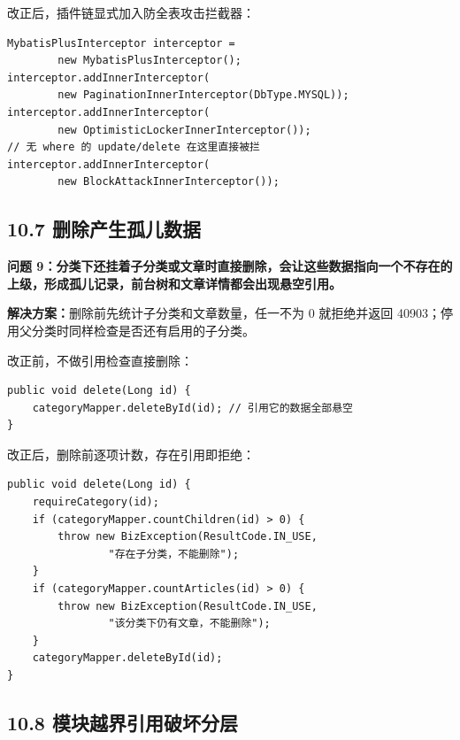 \documentclass[zihao=-4,UTF8,openany]{ctexart}
\renewcommand{\_}{\textunderscore\allowbreak}
\begin{document}
改正后，插件链显式加入防全表攻击拦截器：

\begin{lstlisting}
MybatisPlusInterceptor interceptor =
        new MybatisPlusInterceptor();
interceptor.addInnerInterceptor(
        new PaginationInnerInterceptor(DbType.MYSQL));
interceptor.addInnerInterceptor(
        new OptimisticLockerInnerInterceptor());
// 无 where 的 update/delete 在这里直接被拦
interceptor.addInnerInterceptor(
        new BlockAttackInnerInterceptor());
\end{lstlisting}

\subsection*{\texorpdfstring{\textbf{10.7 删除产生孤儿数据}}{10.7 删除产生孤儿数据}}\label{ux5220ux9664ux5b64ux513f}

\noindent\textbf{问题 9：分类下还挂着子分类或文章时直接删除，会让这些数据指向一个不存在的上级，形成孤儿记录，前台树和文章详情都会出现悬空引用。}

\textbf{解决方案：}删除前先统计子分类和文章数量，任一不为 0 就拒绝并返回 40903；停用父分类时同样检查是否还有启用的子分类。

改正前，不做引用检查直接删除：

\begin{lstlisting}
public void delete(Long id) {
    categoryMapper.deleteById(id); // 引用它的数据全部悬空
}
\end{lstlisting}

改正后，删除前逐项计数，存在引用即拒绝：

\begin{lstlisting}
public void delete(Long id) {
    requireCategory(id);
    if (categoryMapper.countChildren(id) > 0) {
        throw new BizException(ResultCode.IN_USE,
                "存在子分类，不能删除");
    }
    if (categoryMapper.countArticles(id) > 0) {
        throw new BizException(ResultCode.IN_USE,
                "该分类下仍有文章，不能删除");
    }
    categoryMapper.deleteById(id);
}
\end{lstlisting}

\subsection*{\texorpdfstring{\textbf{10.8 模块越界引用破坏分层}}{10.8 模块越界引用破坏分层}}\label{ux6a21ux5757ux8fb9ux754c}
\end{document}
